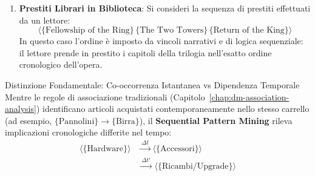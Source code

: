 \begin{enumerate}[label=\textbf{\arabic*.}]
    \item \textbf{Prestiti Librari in Biblioteca}:
    Si consideri la sequenza di prestiti effettuati da un lettore:
    \begin{equation}
    \label{eq:seq-example-library}
    \langle \{\text{Fellowship of the Ring}\} \, \{\text{The Two Towers}\} \, \{\text{Return of the King}\} \rangle
    \end{equation}
    In questo caso l'ordine è imposto da vincoli narrativi e di logica sequenziale: il lettore prende in prestito i capitoli della trilogia nell'esatto ordine cronologico dell'opera.
\end{enumerate}

\begin{noteblock}{Distinzione Fondamentale: Co-occorrenza Istantanea vs Dipendenza Temporale}
    Mentre le regole di associazione tradizionali (Capitolo~\ref{chap:dm-association-analysis}) identificano articoli acquistati contemporaneamente nello stesso carrello (ad esempio, $\{\text{Pannolini}\} \rightarrow \{\text{Birra}\}$), il \textbf{Sequential Pattern Mining} rileva implicazioni cronologiche differite nel tempo:
    \begin{align*}
    \langle \{\text{Hardware}\} \rangle &\xrightarrow{\;\Delta t\;} \langle \{\text{Accessori}\} \rangle \\
    &\xrightarrow{\;\Delta t'\;} \langle \{\text{Ricambi/Upgrade}\} \rangle
    \end{align*}
\end{noteblock}

\FloatBarrier
